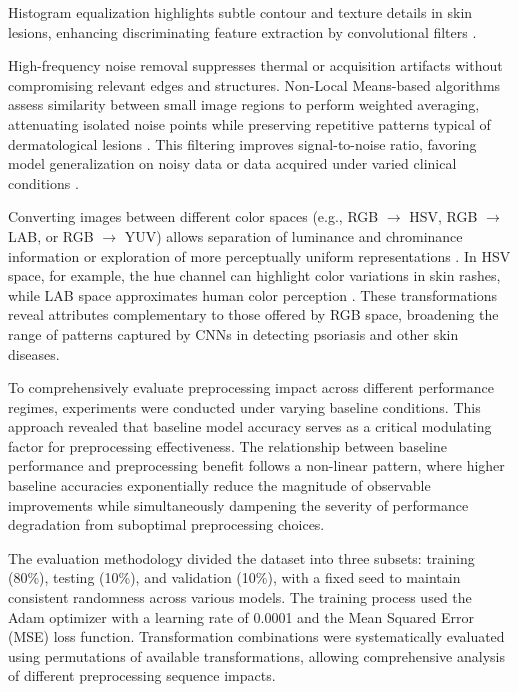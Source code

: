 \documentclass[journal]{IEEEtran}
\begin{document}
Histogram equalization highlights subtle contour and texture details in skin lesions, enhancing discriminating feature extraction by convolutional filters \cite{10.5555/1076432, 10810559, 9025640}.

High-frequency noise removal suppresses thermal or acquisition artifacts without compromising relevant edges and structures. Non-Local Means-based algorithms assess similarity between small image regions to perform weighted averaging, attenuating isolated noise points while preserving repetitive patterns typical of dermatological lesions \cite{MAFI2019236}. This filtering improves signal-to-noise ratio, favoring model generalization on noisy data or data acquired under varied clinical conditions \cite{elad2023imagedenoisingdeeplearning}.

Converting images between different color spaces (e.g., RGB $\to$ HSV, RGB $\to$ LAB, or RGB $\to$ YUV) allows separation of luminance and chrominance information or exploration of more perceptually uniform representations \cite{WANG2018157}. In HSV space, for example, the hue channel can highlight color variations in skin rashes, while LAB space approximates human color perception \cite{ballester2022influencecolorspacesdeep}. These transformations reveal attributes complementary to those offered by RGB space, broadening the range of patterns captured by CNNs in detecting psoriasis and other skin diseases.

To comprehensively evaluate preprocessing impact across different performance regimes, experiments were conducted under varying baseline conditions. This approach revealed that baseline model accuracy serves as a critical modulating factor for preprocessing effectiveness. The relationship between baseline performance and preprocessing benefit follows a non-linear pattern, where higher baseline accuracies exponentially reduce the magnitude of observable improvements while simultaneously dampening the severity of performance degradation from suboptimal preprocessing choices.

The evaluation methodology divided the dataset into three subsets: training (80\%), testing (10\%), and validation (10\%), with a fixed seed to maintain consistent randomness across various models. The training process used the Adam optimizer with a learning rate of 0.0001 and the Mean Squared Error (MSE) loss function. Transformation combinations were systematically evaluated using permutations of available transformations, allowing comprehensive analysis of different preprocessing sequence impacts.
\end{document}
